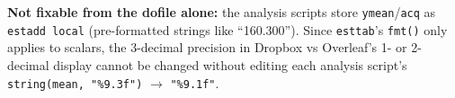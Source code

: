 \documentclass[10pt,landscape]{article}
\begin{document}
\vspace{1em}

\noindent\textbf{Not fixable from the dofile alone:} the analysis scripts
store \texttt{ymean}/\texttt{acq} as \texttt{estadd local} (pre-formatted
strings like ``160.300''). Since \texttt{esttab}'s \texttt{fmt()} only
applies to scalars, the 3-decimal precision in Dropbox vs Overleaf's 1-
or 2-decimal display cannot be changed without editing each analysis
script's \texttt{string(mean, "\%9.3f")} $\rightarrow$ \texttt{"\%9.1f"}.
\end{document}
